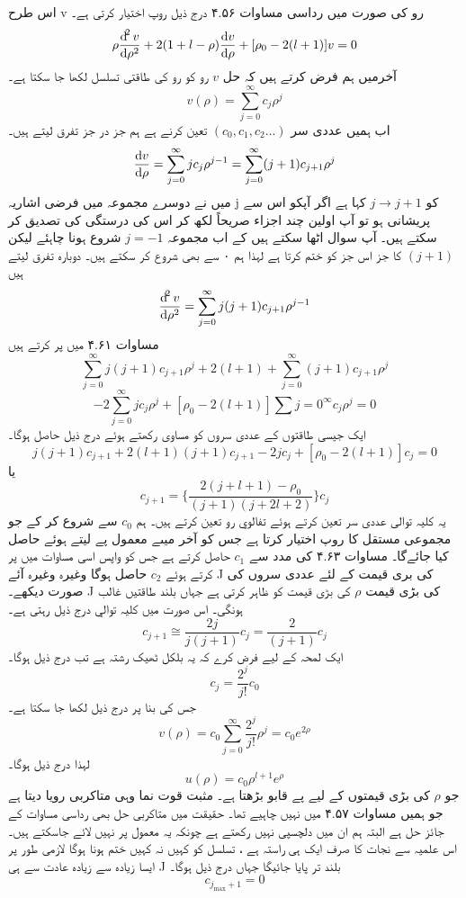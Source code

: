 \documentclass{book}
\begin{document}
  اس طرح v رو کی صورت میں رداسی مساوات ۴.۵۶ 
  درج ذیل روپ اختیار کرتی ہے۔
  \[\rho\frac{\dif^{2}{v}}{\dif{\rho^{2}}}+2(1+l-\rho)\frac{\dif{v}}{\dif{\rho}}+[\rho_{0}-2(l+1)]v=0\]
  آخرمیں ہم فرض کرتے ہیں کہ حل
  \(v\)
    رو کو رو کی طاقتی تسلسل لکھا جا سکتا ہے۔
  \[v(\rho)=\sum_{j=0}^{\infty}c_{j}\rho^{j}\]
اب ہمیں عددی سر 
\((c_{0},c_{1},c_{2}...)\)
تعین کرنے ہے ہم جز در جز تفرق لیتے ہیں۔
\[\frac{\dif{v}}{\dif{\rho}}=\sum_{j=0}^{\infty}jc_{j}\rho^{j-1}=\sum_{j=0}^{\infty}(j+1)c_{j+1}\rho^{j}\]
میں نے دوسرے مجموعہ میں فرضی اشاریہ j کو 
\(j\rightarrow j+1\)
کہا ہے اگر آپکو اس سے پریشانی ہو تو آپ اولین چند اجزاء صریحاً لکھ کر اس کی درستگی کی تصدیق کر سکتے ہیں۔ آپ سوال اٹھا سکتے ہیں کے اب مجموعہ
\(j=-1\)
شروع ہونا چاہئے لیکن
\((j+1)\)
کا جز اس جز کو ختم کرتا ہے لہذا ہم ۰ سے بھی شروع کر سکتے ہیں۔ دوبارہ تفرق لیتے ہیں
\[\frac{\dif^{2}{v}}{\dif{\rho^{2}}}=\sum_{j=0}^{\infty}j(j+1)c_{j+1}\rho^{j-1}\]
مساوات ۴.۶۱ میں پر کرتے ہیں
\[\sum_{j=0}^{\infty}j(j+1)c_{j+1}\rho^{j}+2(l+1)+\sum_{j=0}^{\infty}(j+1)c_{j+1}\rho^{j}\]
\[-2\sum_{j=0}^{\infty}jc_{j}\rho^{j}+[\rho_{0}-2(l+1)]\sum{j=0}^{\infty}c_{j}\rho^{j}=0\]
ایک جیسی طاقتوں کے عددی سروں کو مساوی رکھتے ہوئے درج ذیل حاصل ہوگا۔
\[j(j+1)c_{j+1}+2(l+1)(j+1)c_{j+1}-2jc_{j}+[\rho_{0}-2(l+1)]c_{j}=0\]
یا
\[c_{j+1}=\big\{\frac{2(j+l+1)-\rho_{0}}{(j+1)(j+2l+2)}\big\}c_{j}\]
یہ کلیہ توالی عددی سر تعین کرتے ہوئے تفالوي رو تعین کرتے ہیں۔ ہم
\(c_{0}\)
سے شروع کر کے جو مجموعی مستقل کا روپ اختیار کرتا ہے جس کو آخر میںے معمول پے لیتے ہوئے حاصل کیا جائےگا۔
مساوات ۴.۶۳ کی مدد سے 
\(c_{1}\)
حاصل کرتے ہے جس کو واپس اسی مساوات میں پر کرتے ہوئے
\(c_{2}\)
حاصل ہوگا وغیرہ وغیرہ آئے J کی بری قیمت کے لئے عددی سروں کی صورت دیکھے۔ J کی بڑی قیمت 
\(\rho\)
 کی بڑی قیمت کو ظاہر کرتی ہے جہاں بلند طاقتیں غالب ہونگی۔ اس صورت میں کلیہ توالي درج ذیل رہتی ہے۔\\
\[c_{j+1}\cong\frac{2j}{j(j+1)}c_{j}=\frac{2}{(j+1)}c_{j}\]
ایک لمحہ کے لیے فرض کرے کہ یہ بلکل ٹھیک رشتہ ہے تب درج ذیل ہوگا۔
\[c_{j}=\frac{2^{j}}{j!}c_{0}\]
جس کی بنا پر درج ذیل لکھا جا سکتا ہے۔
\[v(\rho)=c_{0}\sum_{j=0}^{\infty}\frac{2^{j}}{j!}\rho^{j}=c_{0}e^{2\rho}\]
لہذا درج ذیل ہوگا۔
\[u(\rho)=c_{0}\rho^{l+1}e^{\rho}\]
 جو
  \(\rho\) 
 کی بڑی قیمتوں کے لیے پے قابو بڑھتا ہے۔ مثبت قوت نما وہی متاکربی رویا دیتا ہے جو ہمیں مساوات ۴.۵۷ میں نہیں چاہیے تھا۔ حقیقت میں متاکربی حل بھی رداسی مساوات کے جائز حل ہے البتہ ہم ان میں دلچسپی نہیں رکھتے ہے چونکہ یہ معمول پر نہیں لائے جاسکتے ہیں۔ اس علمیہ سے نجات کا صرف ایک ہی راستہ ہے ، تسلسل کو کہیں نہ کہیں ختم ہونا ہوگا لازمی طور پر ایسا زیادہ سے زیادہ عادت سے ہی J بلند تر پایا جائیگا جہاں درج ذیل ہوگا۔
 \[c_{j_{\text{max}}+1}=0\]
\end{document}
